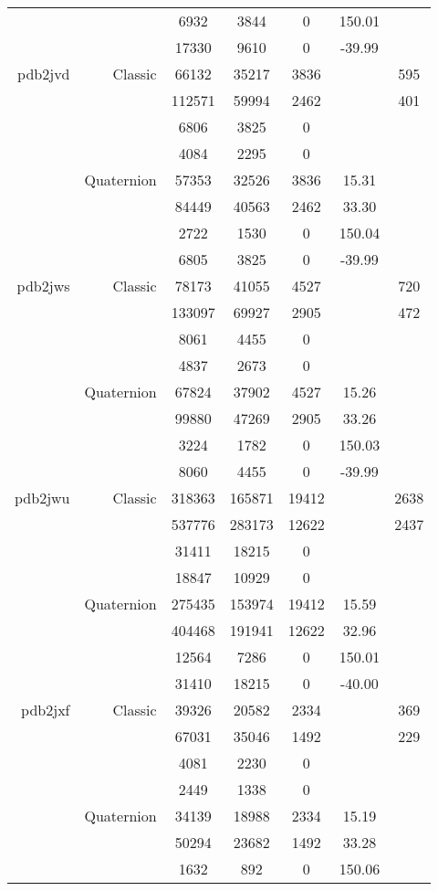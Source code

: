 \begin{xltabular}{\textwidth}{r|rcccSc}
& & 6932 & 3844 & 0 & 150.01 & \\
& & 17330 & 9610 & 0 & -39.99 & \\ \addlinespace
pdb2jvd & Classic & 66132 & 35217 & 3836 & & 595 \\
& & 112571 & 59994 & 2462 & & 401 \\
& & 6806 & 3825 & 0 & & \\
& & 4084 & 2295 & 0 & & \\
& Quaternion & 57353 & 32526 & 3836 & 15.31 & \\
& & 84449 & 40563 & 2462 & 33.30 & \\
& & 2722 & 1530 & 0 & 150.04 & \\
& & 6805 & 3825 & 0 & -39.99 & \\ \addlinespace
pdb2jws & Classic & 78173 & 41055 & 4527 & & 720 \\
& & 133097 & 69927 & 2905 & & 472 \\
& & 8061 & 4455 & 0 & & \\
& & 4837 & 2673 & 0 & & \\
& Quaternion & 67824 & 37902 & 4527 & 15.26 & \\
& & 99880 & 47269 & 2905 & 33.26 & \\
& & 3224 & 1782 & 0 & 150.03 & \\
& & 8060 & 4455 & 0 & -39.99 & \\ \addlinespace
pdb2jwu & Classic & 318363 & 165871 & 19412 & & 2638 \\
& & 537776 & 283173 & 12622 & & 2437 \\
& & 31411 & 18215 & 0 & & \\
& & 18847 & 10929 & 0 & & \\
& Quaternion & 275435 & 153974 & 19412 & 15.59 & \\
& & 404468 & 191941 & 12622 & 32.96 & \\
& & 12564 & 7286 & 0 & 150.01 & \\
& & 31410 & 18215 & 0 & -40.00 & \\ \addlinespace
pdb2jxf & Classic & 39326 & 20582 & 2334 & & 369 \\
& & 67031 & 35046 & 1492 & & 229 \\
& & 4081 & 2230 & 0 & & \\
& & 2449 & 1338 & 0 & & \\
& Quaternion & 34139 & 18988 & 2334 & 15.19 & \\
& & 50294 & 23682 & 1492 & 33.28 & \\
& & 1632 & 892 & 0 & 150.06 & \\

\end{xltabular}
